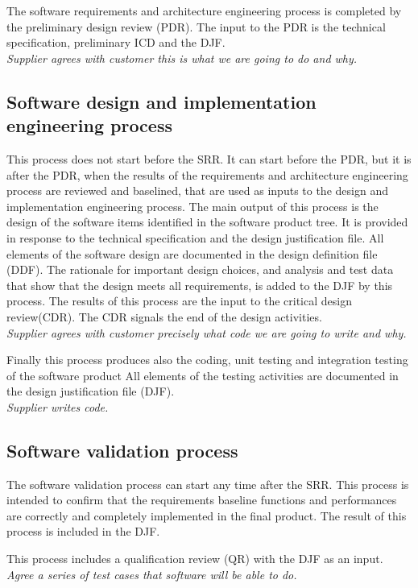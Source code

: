 \documentclass[12pt]{article}
\begin{document}
The software requirements and architecture engineering process is completed by
the preliminary design review (PDR).
The input to the PDR is the technical specification, preliminary ICD and the DJF. \\
\emph{Supplier agrees with customer  this is what we are going to do and why.}

\subsection{Software design and implementation engineering process}
This process does not start before the SRR.
It can start before the PDR, but it is after the PDR, when the results of
the requirements and architecture engineering process are reviewed and
baselined, that are used as inputs to the design and implementation engineering process.
The main output of this process is the design of the software items identified in the software product tree.
It is provided in response to the technical specification and the design
justification file.
All elements of the software design are documented in the design definition file (DDF).
The rationale for important design choices, and analysis and test data that
show that the design meets all requirements, is added to the DJF by this
process.
The results of this process are the input to the critical design review(CDR).
The CDR signals the end of the design activities. \\
\emph{Supplier agrees with customer  precisely what code we are going to write and why.}

Finally this process produces also the coding, unit testing and integration testing of the software product
All elements of the testing activities are documented in the design justification file (DJF). \\
\emph{Supplier writes code.}

\subsection{Software validation process}
The software validation process can start any time after the SRR.
This process is intended to confirm that the requirements baseline functions
and performances are correctly and completely implemented in the final
product.
The result of this process is included in the DJF.

This process includes a qualification review (QR) with the DJF as an input. \\
\emph{Agree a series of test cases that software will be able to do.}
\end{document}
